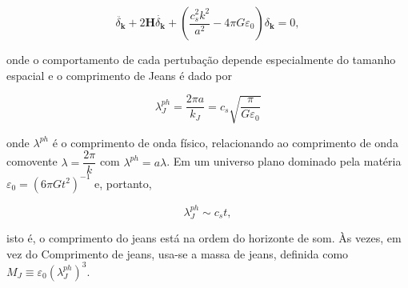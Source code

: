 \begin{equation}\label{eq31}
	\ddot{\delta_\mathbf{k}} + 2\mathbf{H}\dot{\delta_\mathbf{k}} + \left( \dfrac{c^2_s k^2}{a^2} -4\pi G\varepsilon_0\right)\delta_\mathbf{k} = 0,
\end{equation} 

onde o comportamento de cada pertubação depende especialmente do tamanho espacial e o comprimento de Jeans é dado por

\begin{equation}\label{eq32}
	\lambda^{ph}_J = \dfrac{2\pi a }{k_J} = c_s\sqrt{\dfrac{\pi}{G\varepsilon_0}}
\end{equation}

onde $\lambda^{ph}$ é o comprimento de onda físico, relacionando
ao comprimento de onda comovente $\lambda = \dfrac{2\pi}{k}$ com $\lambda^{ph} = a\lambda$. Em um universo plano dominado pela matéria $\varepsilon_0 = (6\pi G t^2)^{-1}$ e, portanto,

\begin{equation}\label{eq33}
	\lambda_J^{ph} \sim c_s t,
\end{equation}

isto é, o comprimento do jeans está na ordem do horizonte de som. Às vezes, em vez do
Comprimento de jeans, usa-se a massa de jeans, definida como $M_J \equiv\varepsilon_0 (\lambda_J^{ph})^3$.



